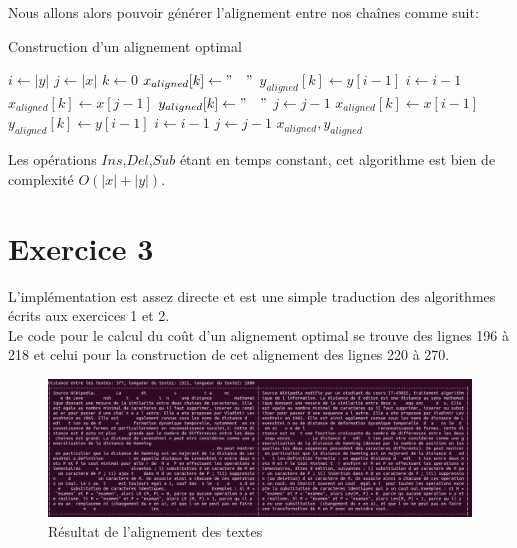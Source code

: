 \documentclass{article}
\begin{document}
Nous allons alors pouvoir générer l'alignement entre nos chaînes comme suit:
\begin{algorithm}
\caption{Construction d'un alignement optimal}\label{algo:alignement}
\begin{algorithmic}[1]
	\State $i \gets  \lvert y \rvert $	
	\State $j \gets  \lvert x \rvert $	
	\State $k \gets 0$
			\State $x_{aligned}[k] \gets "\quad"$
			\State $y_{aligned}[k] \gets y[i-1]$
			\State $i \gets i-1$
			\State $x_{aligned}[k] \gets x[j-1]$
			\State $y_{aligned}[k] \gets "\quad"$
			\State $j \gets j-1$
			\State $x_{aligned}[k] \gets x[i-1]$
			\State $y_{aligned}[k] \gets y[i-1]$
			\State $i \gets i-1$
			\State $j \gets j-1$
		\EndIf
	\EndWhile	
	\State\Return $x_{aligned}, y_{aligned}$
\EndProcedure
\end{algorithmic}
\end{algorithm}

Les opérations $Ins$,$Del$,$Sub$ étant en temps constant, cet algorithme est 
bien de complexité $O(\lvert x\rvert+\lvert y\rvert)$.

\section{Exercice 3}

L'implémentation est assez directe et est une simple traduction des
algorithmes écrits aux exercices 1 et 2.\\
Le code pour le calcul du coût d'un alignement optimal se trouve des lignes 196
à 218 et celui pour la construction de cet alignement des lignes 220 à 270.\\

\begin{figure}[!hbt]
	\centering
	\includegraphics[width=0.95\linewidth]{./images/exo3.png}
	\caption{Résultat de l'alignement des textes}%
	\label{fig:exo3}
\end{figure}
\end{document}
